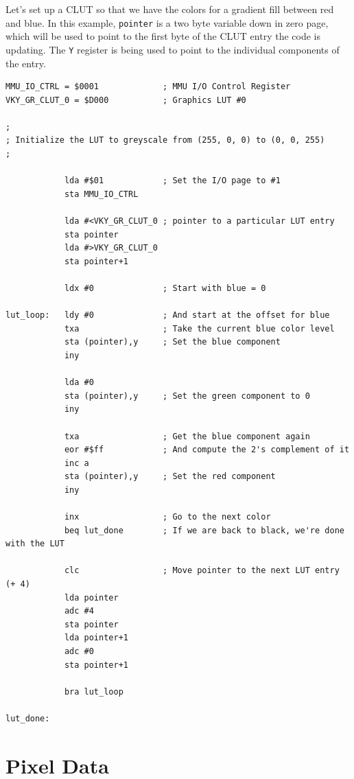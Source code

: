 
Let's set up a CLUT so that we have the colors for a gradient fill between red and blue. In this example, \verb+pointer+ is a two byte variable down in zero page, which will be used to point to the first byte of the CLUT entry the code is updating. The \verb+Y+ register is being used to point to the individual components of the entry.

\begin{verbatim}
MMU_IO_CTRL = $0001             ; MMU I/O Control Register
VKY_GR_CLUT_0 = $D000           ; Graphics LUT #0

;
; Initialize the LUT to greyscale from (255, 0, 0) to (0, 0, 255)
;

            lda #$01            ; Set the I/O page to #1
            sta MMU_IO_CTRL

            lda #<VKY_GR_CLUT_0 ; pointer to a particular LUT entry
            sta pointer
            lda #>VKY_GR_CLUT_0
            sta pointer+1

            ldx #0              ; Start with blue = 0

lut_loop:   ldy #0              ; And start at the offset for blue
            txa                 ; Take the current blue color level
            sta (pointer),y     ; Set the blue component
            iny

            lda #0
            sta (pointer),y     ; Set the green component to 0
            iny

            txa                 ; Get the blue component again
            eor #$ff            ; And compute the 2's complement of it
            inc a
            sta (pointer),y     ; Set the red component
            iny

            inx                 ; Go to the next color
            beq lut_done        ; If we are back to black, we're done with the LUT

            clc                 ; Move pointer to the next LUT entry (+ 4)
            lda pointer
            adc #4
            sta pointer
            lda pointer+1
            adc #0
            sta pointer+1

            bra lut_loop

lut_done:
\end{verbatim}

\section*{Pixel Data}

